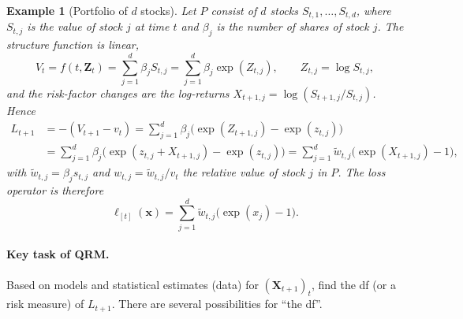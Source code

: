 \documentclass[11pt,a4paper]{article}
\newtheorem{example}{Example}
\begin{document}
\begin{example}[Portfolio of $d$ stocks]\label{ex:stocks}
Let $P$ consist of $d$ stocks $S_{t,1},\dots,S_{t,d}$, where $S_{t,j}$ is the value of stock $j$ at
time $t$ and $\beta_j$ is the number of shares of stock $j$. The structure function is linear,
\[
  V_t=f(t,\mathbf{Z}_t)=\sum_{j=1}^d \beta_j S_{t,j}
      =\sum_{j=1}^d \beta_j \exp(Z_{t,j}),
  \qquad Z_{t,j}=\log S_{t,j},
\]
and the risk-factor changes are the log-returns
$X_{t+1,j}=\log(S_{t+1,j}/S_{t,j})$. Hence
\begin{equation}\label{eq:stockPL}
  \begin{aligned}
    L_{t+1}&=-(V_{t+1}-v_t)
      =\sum_{j=1}^d \beta_j\big(\exp(Z_{t+1,j})-\exp(z_{t,j})\big)\\
      &=\sum_{j=1}^d \beta_j\big(\exp(z_{t,j}+X_{t+1,j})-\exp(z_{t,j})\big)
      =\sum_{j=1}^d \tilde w_{t,j}\big(\exp(X_{t+1,j})-1\big),
  \end{aligned}
\end{equation}
with $\tilde w_{t,j}=\beta_j s_{t,j}$ and $w_{t,j}=\tilde w_{t,j}/v_t$ the relative value of stock
$j$ in $P$. The loss operator is therefore
\begin{equation}\label{eq:stocklossop}
  \ell_{[t]}(\mathbf{x})=\sum_{j=1}^d \tilde w_{t,j}\big(\exp(x_j)-1\big).
\end{equation}
\end{example}

\paragraph{Key task of QRM.} Based on models and statistical estimates (data) for
$(\mathbf{X}_{t+1})_t$, find the df (or a risk measure) of $L_{t+1}$. There are several
possibilities for ``the df''.
\end{document}
